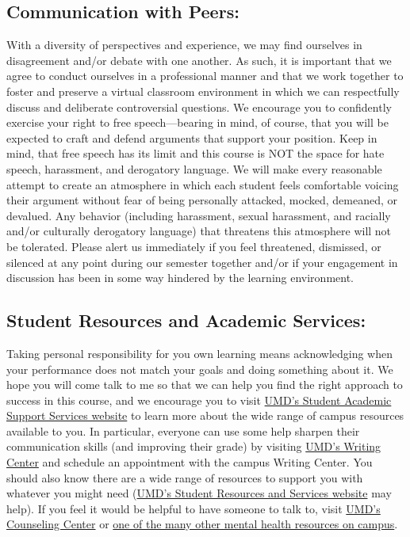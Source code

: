 \documentclass[
]{book}
\begin{document}
\hypertarget{communication-with-peers}{%
\subsection{Communication with Peers:}\label{communication-with-peers}}

With a diversity of perspectives and experience, we may find ourselves in disagreement and/or debate with one another. As such, it is important that we agree to conduct ourselves in a professional manner and that we work together to foster and preserve a virtual classroom environment in which we can respectfully discuss and deliberate controversial questions. We encourage you to confidently exercise your right to free speech---bearing in mind, of course, that you will be expected to craft and defend arguments that support your position. Keep in mind, that free speech has its limit and this course is NOT the space for hate speech, harassment, and derogatory language. We will make every reasonable attempt to create an atmosphere in which each student feels comfortable voicing their argument without fear of being personally attacked, mocked, demeaned, or devalued. Any behavior (including harassment, sexual harassment, and racially and/or culturally derogatory language) that threatens this atmosphere will not be tolerated. Please alert us immediately if you feel threatened, dismissed, or silenced at any point during our semester together and/or if your engagement in discussion has been in some way hindered by the learning environment.

\hypertarget{student-resources-and-academic-services}{%
\subsection{Student Resources and Academic Services:}\label{student-resources-and-academic-services}}

Taking personal responsibility for you own learning means acknowledging when your performance does not match your goals and doing something about it. We hope you will come talk to me so that we can help you find the right approach to success in this course, and we encourage you to visit \href{http://tutoring.umd.edu}{UMD's Student Academic Support Services website} to learn more about the wide range of campus resources available to you. In particular, everyone can use some help sharpen their communication skills (and improving their grade) by visiting \href{http://www.english.umd.edu/academics/writingcenter/schedule}{UMD's Writing Center} and schedule an appointment with the campus Writing Center. You should also know there are a wide range of resources to support you with whatever you might need (\href{https://sph.umd.edu/content/student-resources-and-services}{UMD's Student Resources and Services website} may help). If you feel it would be helpful to have someone to talk to, visit \href{https://www.counseling.umd.edu/}{UMD's Counseling Center} or \href{https://tltc.umd.edu/supporting-whole-student}{one of the many other mental health resources on campus}.
\end{document}
